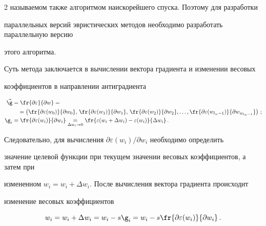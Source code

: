 \begin{multicols}{2}
называемом также алгоритмом наискорейшего спуска. Поэтому для разработки


параллельных версий эвристических методов необходимо разработать параллельную версию


этого алгоритма.





 Суть метода заключается в вычислении вектора градиента и изменении весовых


коэффициентов в направлении антиградиента~\cite{9kr, 10kr}


\begin{align*}


\vec{\g} &= \fr{\partial \varepsilon}{\partial w} ={}\\


&\ \ \ {}=\left ( \fr{\partial \varepsilon (w_0)}{\partial


w_0},\,\fr{\partial \varepsilon (w_1)}{\partial w_1},\,\fr{\partial \varepsilon (w_2)}{\partial


w_2},\ldots , \fr{\partial \varepsilon (w_{l_w-1})}{\partial w_{w_{l_w-1}}}\right


)\,;\\


\g_i & = \fr{\partial \varepsilon (w_i)}{ \partial w_i} \underset{\Delta w_i\rightarrow 0}{=}


\fr{\varepsilon (w_i+\Delta w_i)-\varepsilon(w_i)}{\Delta w_i}\,.


\end{align*}





Следовательно, для вычисления $\partial \varepsilon (w_i)/\partial w_i$ необходимо определить


значение целевой функции при текущем значении весовых коэффициентов, а затем при


измененном $w_i=w_i+\Delta w_i$. После вычисления вектора градиента происходит


изменение весовых коэффициентов


\begin{equation*}


w_i = w_i+\Delta w_i = w_i-s\g_i=w_i-s\fr{\partial \varepsilon(w_i)}{\partial w_i}\,.




\end{equation*}






\end{multicols}
